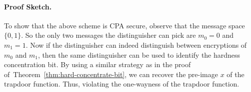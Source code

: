 \paragraph{Proof Sketch.} To show that the above scheme is CPA secure, observe that the message space $\{0,1\}$. So the only two messages the distinguisher can pick are $m_0=0$ and $m_1=1$. Now if the distinguisher can indeed distinguish between encryptions of $m_0$ and $m_1$, then the same distinguisher can be used to identify the hardness concentration bit. By using a similar strategy as in the proof of~Theorem~\ref{thm:hard-concentrate-bit}, we can recover the pre-image $x$ of the trapdoor function. Thus, violating the one-wayness of the trapdoor function.



